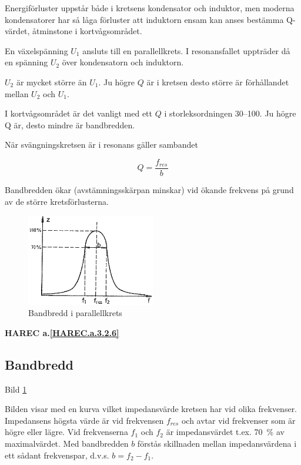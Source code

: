 Energiförluster uppstår både i kretsens kondensator och induktor, men moderna
kondensatorer har så låga förluster att induktorn ensam kan anses bestämma
Q-värdet, åtminstone i kortvågsområdet.

En växelspänning \(U_1\) ansluts till en parallellkrets. I resonansfallet
uppträder då en spänning \(U_2\) över kondensatorn och induktorn.

\(U_2\) är mycket större än \(U_1\). Ju högre \(Q\) är i kretsen desto större är
förhållandet mellan \(U_2\) och \(U_1\).

I kortvågsområdet är det vanligt med ett \(Q\) i storleksordningen 30--100.
Ju högre Q är, desto mindre är bandbredden.

När svängningskretsen är i resonans gäller sambandet

\[Q = \frac{f_{res}}{b}\]

Bandbredden ökar (avstämningsskärpan minskar) vid ökande frekvens på grund av de
större kretsförlusterna.

\begin{figure}
\includegraphics[width=0.5\textwidth]{images/bild_2_3-21.png}
\caption{Bandbredd i parallellkrets}
\label{fig:BildII3-21}
\end{figure}

\textbf{HAREC a.\ref{HAREC.a.3.2.6}\label{myHAREC.a.3.2.6}}

\subsection{Bandbredd}

Bild \ref{fig:BildII3-21}

Bilden visar med en kurva vilket impedansvärde kretsen har vid olika frekvenser.
Impedansens högsta värde är vid frekvensen \(f_{res}\) och avtar vid frekvenser
som är högre eller lägre. Vid frekvenserna \(f_1\) och \(f_2\) är
impedansvärdet t.ex. 70~\% av maximalvärdet. Med bandbredden \(b\) förstås
skillnaden mellan impedansvärdena i ett sådant frekvenspar, d.v.s.
\(b = f_2 - f_1\).
